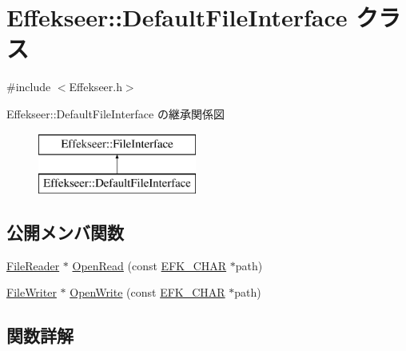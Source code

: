 \hypertarget{class_effekseer_1_1_default_file_interface}{}\section{Effekseer\+:\+:Default\+File\+Interface クラス}
\label{class_effekseer_1_1_default_file_interface}


{\ttfamily \#include $<$Effekseer.\+h$>$}

Effekseer\+:\+:Default\+File\+Interface の継承関係図\begin{figure}[H]
\begin{center}
\leavevmode
\includegraphics[height=2.000000cm]{class_effekseer_1_1_default_file_interface}
\end{center}
\end{figure}
\subsection*{公開メンバ関数}
\begin{DoxyCompactItemize}
\item 
\mbox{\hyperlink{class_effekseer_1_1_file_reader}{File\+Reader}} $\ast$ \mbox{\hyperlink{class_effekseer_1_1_default_file_interface_a03d6224d1eb0124a21f42c578e447d51}{Open\+Read}} (const \mbox{\hyperlink{_effekseer_8h_aca7eb5de6dd019c19ac58ea35a193f2f}{E\+F\+K\+\_\+\+C\+H\+AR}} $\ast$path)
\item 
\mbox{\hyperlink{class_effekseer_1_1_file_writer}{File\+Writer}} $\ast$ \mbox{\hyperlink{class_effekseer_1_1_default_file_interface_aecbcd4350ca701360dcea88a2c5f9c64}{Open\+Write}} (const \mbox{\hyperlink{_effekseer_8h_aca7eb5de6dd019c19ac58ea35a193f2f}{E\+F\+K\+\_\+\+C\+H\+AR}} $\ast$path)
\end{DoxyCompactItemize}


\subsection{関数詳解}
\mbox{\label{class_effekseer_1_1_default_file_interface_a03d6224d1eb0124a21f42c578e447d51}} 
